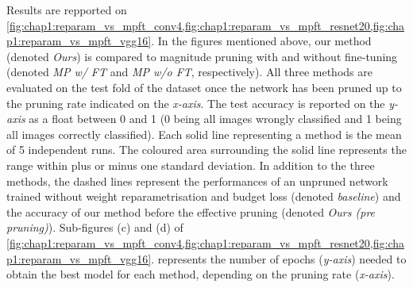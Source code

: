 Results are repported on
\cref{fig:chap1:reparam_vs_mpft_conv4,fig:chap1:reparam_vs_mpft_resnet20,fig:chap1:reparam_vs_mpft_vgg16}.
In the figures mentioned above, our method (denoted \emph{Ours}) is compared to
magnitude pruning with and without fine-tuning (denoted \emph{MP w/ FT} and
\emph{MP w/o FT}, respectively). All three methods are evaluated on the test
fold of the dataset once the network has been pruned up to the pruning rate
indicated on the \emph{x-axis}. The test accuracy is reported on the \emph{y-axis} as a float between
0 and 1 (0 being all images wrongly classified and 1 being all images correctly
classified). Each solid line representing a method is the mean of 5 independent
runs. The coloured area surrounding the solid line represents the range within
plus or minus one standard deviation. In addition to the three methods, the
dashed lines represent the performances of an unpruned network trained without
weight reparametrisation and budget loss (denoted \emph{baseline}) and the
accuracy of our method before the effective pruning (denoted \emph{Ours (pre
pruning)}). Sub-figures (c) and (d) of
\cref{fig:chap1:reparam_vs_mpft_conv4,fig:chap1:reparam_vs_mpft_resnet20,fig:chap1:reparam_vs_mpft_vgg16}.
represents the number of epochs (\emph{y-axis}) needed to obtain the best model
for each method, depending on the pruning rate (\emph{x-axis}).\\


